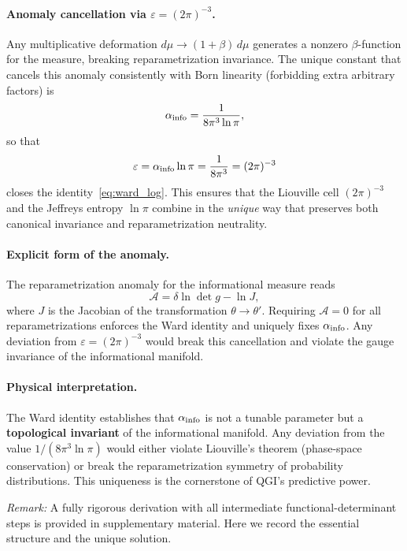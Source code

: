 \documentclass{article}
\numberwithin{equation}{section}
\theoremstyle{plain}
\theoremstyle{definition}
\theoremstyle{remark}
\begin{document}
\paragraph{Anomaly cancellation via $\varepsilon = (2\pi)^{-3}$.}
Any multiplicative deformation $d\mu \to (1+\beta)\,d\mu$ generates a nonzero $\beta$-function for the measure, breaking reparametrization invariance. The unique constant that cancels this anomaly consistently with Born linearity (forbidding extra arbitrary factors) is
\begin{equation}
\alpha_{\rm info} = \frac{1}{8\pi^3\ln\pi},
\end{equation}
so that
\begin{equation}
\varepsilon = \alpha_{\rm info}\ln\pi = \frac{1}{8\pi^3} = (2\pi)^{-3}
\end{equation}
closes the identity~\eqref{eq:ward_log}. This ensures that the Liouville cell $(2\pi)^{-3}$ and the Jeffreys entropy $\ln\pi$ combine in the \emph{unique} way that preserves both canonical invariance and reparametrization neutrality.

\paragraph{Explicit form of the anomaly.}
The reparametrization anomaly for the informational measure reads
\begin{equation}
\mathcal{A} = \delta \ln \det g - \ln J,
\end{equation}
where $J$ is the Jacobian of the transformation $\theta \to \theta'$. Requiring $\mathcal{A} = 0$ for all reparametrizations enforces the Ward identity and uniquely fixes $\alpha_{\rm info}$. Any deviation from $\varepsilon = (2\pi)^{-3}$ would break this cancellation and violate the gauge invariance of the informational manifold.

\paragraph{Physical interpretation.}
The Ward identity establishes that $\alpha_{\rm info}$ is not a tunable parameter but a \textbf{topological invariant} of the informational manifold. Any deviation from the value $1/(8\pi^3\ln\pi)$ would either violate Liouville's theorem (phase-space conservation) or break the reparametrization symmetry of probability distributions. This uniqueness is the cornerstone of QGI's predictive power.

\emph{Remark:} A fully rigorous derivation with all intermediate functional-determinant steps is provided in supplementary material. Here we record the essential structure and the unique solution.
\end{document}
